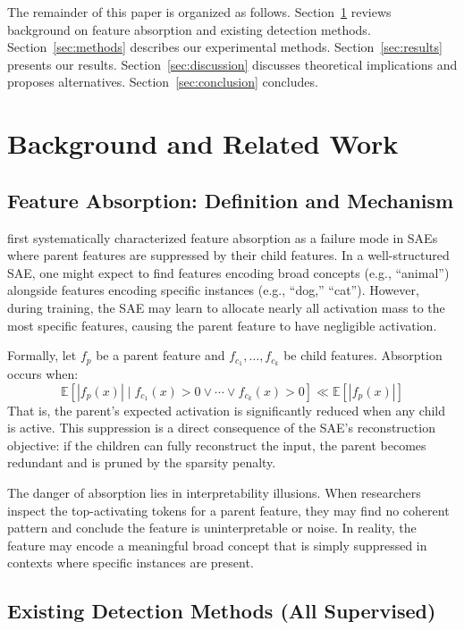 \documentclass{article}
\begin{document}
The remainder of this paper is organized as follows. Section~\ref{sec:background} reviews background on feature absorption and existing detection methods. Section~\ref{sec:methods} describes our experimental methods. Section~\ref{sec:results} presents our results. Section~\ref{sec:discussion} discusses theoretical implications and proposes alternatives. Section~\ref{sec:conclusion} concludes.

\section{Background and Related Work}
\label{sec:background}

\subsection{Feature Absorption: Definition and Mechanism}

\citet{chanin2024absorption} first systematically characterized feature absorption as a failure mode in SAEs where parent features are suppressed by their child features. In a well-structured SAE, one might expect to find features encoding broad concepts (e.g., ``animal'') alongside features encoding specific instances (e.g., ``dog,'' ``cat''). However, during training, the SAE may learn to allocate nearly all activation mass to the most specific features, causing the parent feature to have negligible activation.

Formally, let $f_p$ be a parent feature and $f_{c_1}, \ldots, f_{c_k}$ be child features. Absorption occurs when:
\begin{equation}
\mathbb{E}[|f_p(x)| \mid f_{c_1}(x) > 0 \lor \cdots \lor f_{c_k}(x) > 0] \ll \mathbb{E}[|f_p(x)|]
\end{equation}
That is, the parent's expected activation is significantly reduced when any child is active. This suppression is a direct consequence of the SAE's reconstruction objective: if the children can fully reconstruct the input, the parent becomes redundant and is pruned by the sparsity penalty.

The danger of absorption lies in interpretability illusions. When researchers inspect the top-activating tokens for a parent feature, they may find no coherent pattern and conclude the feature is uninterpretable or noise. In reality, the feature may encode a meaningful broad concept that is simply suppressed in contexts where specific instances are present.

\subsection{Existing Detection Methods (All Supervised)}
\end{document}
